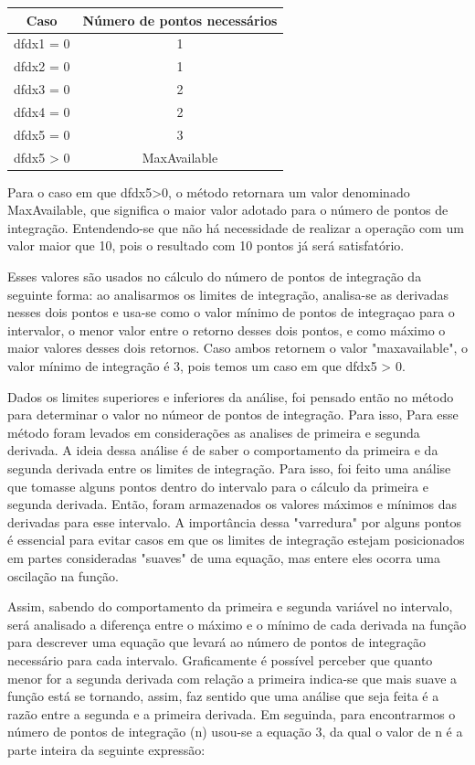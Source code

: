 \documentclass[12pt,a4paper]{article}
\begin{document}
\begin{center}
    \begin{tabular}{| c | c |}
    \hline
    Caso & Número de pontos necessários\\ \hline
    dfdx1 = 0 & 1 \\ \hline
    dfdx2 = 0 & 1 \\ \hline
    dfdx3 = 0 & 2 \\ \hline
    dfdx4 = 0 & 2 \\ \hline
    dfdx5 = 0 & 3 \\ \hline
    dfdx5 > 0 & MaxAvailable \\ \hline
  
    \hline
    \end{tabular}
\end{center}

Para o caso em que dfdx5>0, o método retornara um valor denominado MaxAvailable, que significa o maior valor adotado para o número de pontos de integração. Entendendo-se que não há necessidade de realizar a operação com um valor maior que 10, pois o resultado com 10 pontos já será satisfatório. 

Esses valores são usados no cálculo do número de pontos de integração da seguinte forma: ao analisarmos os limites de integração, analisa-se as derivadas nesses dois pontos e usa-se como o valor mínimo de pontos de integraçao para o intervalor, o menor valor entre o retorno desses dois pontos, e como máximo o maior valores desses dois retornos. Caso ambos retornem o valor "maxavailable", o valor mínimo de integração é 3, pois temos um caso em que dfdx5 > 0.

Dados os limites superiores e inferiores da análise, foi pensado então no método para determinar o valor no númeor de pontos de integração. Para isso, Para esse método foram levados em considerações as analises de primeira e segunda derivada. A ideia dessa análise é de saber o comportamento da primeira e da segunda derivada entre os limites de integração. Para isso, foi feito uma análise que tomasse alguns pontos dentro do intervalo para o cálculo da primeira e segunda derivada. Então, foram armazenados os valores máximos e mínimos das derivadas para esse intervalo. A importância dessa "varredura" por alguns pontos é essencial para evitar casos em que os limites de integração estejam posicionados em partes consideradas "suaves" de uma equação, mas entere eles ocorra uma oscilação na função.

Assim, sabendo do comportamento da primeira e segunda variável no intervalo, será analisado a diferença entre o máximo e o mínimo de cada derivada na função para descrever uma equação que levará ao número de pontos de integração necessário para cada intervalo.
Graficamente é possível perceber que quanto menor for  a segunda derivada com relação a primeira indica-se que mais suave a função está se tornando, assim, faz sentido que uma análise que seja feita é a razão entre a segunda e a primeira derivada. Em seguinda, para encontrarmos o número de pontos de integração (n) usou-se a equação 3, da qual o valor de n é a parte inteira da seguinte expressão:
\end{document}

